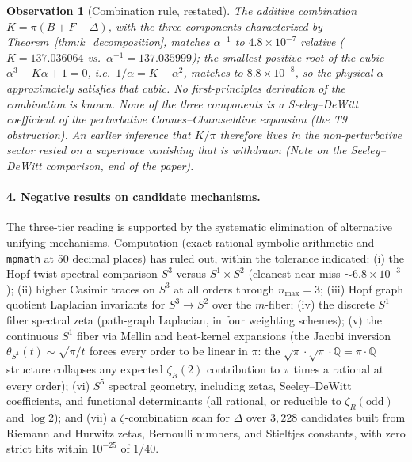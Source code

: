 \documentclass[aps,pra,twocolumn,superscriptaddress,longbibliography]{revtex4-2}
\newtheorem{observation}{Observation}
\begin{document}
\begin{observation}[Combination rule, restated]
\label{obs:k_rule}
The additive combination $K = \pi(B + F - \Delta)$, with the three
components characterized by Theorem~\ref{thm:k_decomposition},
matches $\alpha^{-1}$ to $4.8 \times 10^{-7}$ relative
($K = 137.036064$ vs.\ $\alpha^{-1} = 137.035999$); the smallest
positive root of the cubic $\alpha^3 - K\alpha + 1 = 0$, i.e.\
$1/\alpha = K - \alpha^2$, matches to $8.8\times10^{-8}$, so the
physical $\alpha$ approximately satisfies that cubic.  No first-principles
derivation of the combination is known.
None of the three components is a Seeley--DeWitt coefficient of the
perturbative Connes--Chamseddine expansion (the T9 obstruction).  An
earlier inference that $K/\pi$ therefore lives in the non-perturbative
sector rested on a supertrace vanishing that is withdrawn (Note on the
Seeley--DeWitt comparison, end of the paper).
\end{observation}

\paragraph{4. Negative results on candidate mechanisms.}
The three-tier reading is supported by the systematic elimination
of alternative unifying mechanisms.  Computation (exact rational
symbolic arithmetic and \texttt{mpmath} at 50 decimal places)
has ruled out, within the tolerance indicated:
(i) the Hopf-twist spectral comparison $S^3$ versus $S^1 \times S^2$
(cleanest near-miss $\sim 6.8 \times 10^{-3}$);
(ii) higher Casimir traces on $S^3$ at all orders through
$n_{\max} = 3$;
(iii) Hopf graph quotient Laplacian invariants for
$S^3 \to S^2$ over the $m$-fiber;
(iv) the discrete $S^1$ fiber spectral zeta (path-graph Laplacian,
in four weighting schemes);
(v) the continuous $S^1$ fiber via Mellin and heat-kernel expansions
(the Jacobi inversion $\theta_{S^1}(t) \sim \sqrt{\pi/t}$ forces every
order to be linear in $\pi$: the $\sqrt{\pi}\cdot\sqrt{\pi}\cdot\mathbb{Q}
= \pi\cdot\mathbb{Q}$ structure collapses any expected $\zeta_R(2)$
contribution to $\pi$ times a rational at every order);
(vi) $S^5$ spectral geometry, including zetas, Seeley--DeWitt
coefficients, and functional determinants (all rational, or
reducible to $\zeta_R(\mathrm{odd})$ and $\log 2$);
and (vii) a $\zeta$-combination scan for $\Delta$ over $3{,}228$
candidates built from Riemann and Hurwitz zetas, Bernoulli numbers,
and Stieltjes constants, with zero strict hits within $10^{-25}$
of $1/40$.
\end{document}

